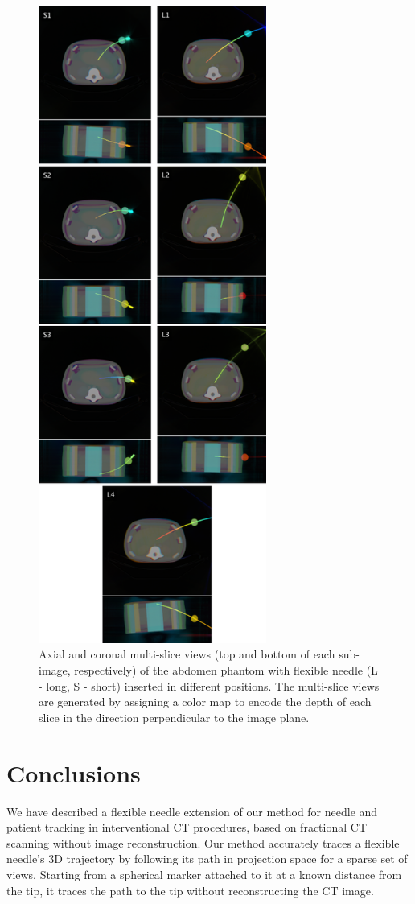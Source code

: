 \documentclass[letterpaper, 11 pt, conference]{ieeeconf}  %
\begin{document}
\begin{figure}[]
\centering
\includegraphics[width=7.5cm]{multislices.png}
\caption{Axial and coronal multi-slice views (top and bottom of each sub-image, respectively) of the abdomen phantom with flexible needle (L - long, S - short) inserted in different positions. The multi-slice views are generated by assigning a color map to encode the depth of each slice in the direction perpendicular to the image plane.}
\label{multislices_fig}
\end{figure}

\section{Conclusions}
We have described a flexible needle extension of our method for needle and patient tracking in interventional CT procedures, based on fractional CT scanning without image reconstruction.
Our method accurately traces a flexible needle's 3D trajectory by following its path in projection space for a sparse set of views. Starting from a spherical marker attached to it at a known distance from the tip, it traces the path to the tip without reconstructing the CT image.
\end{document}
